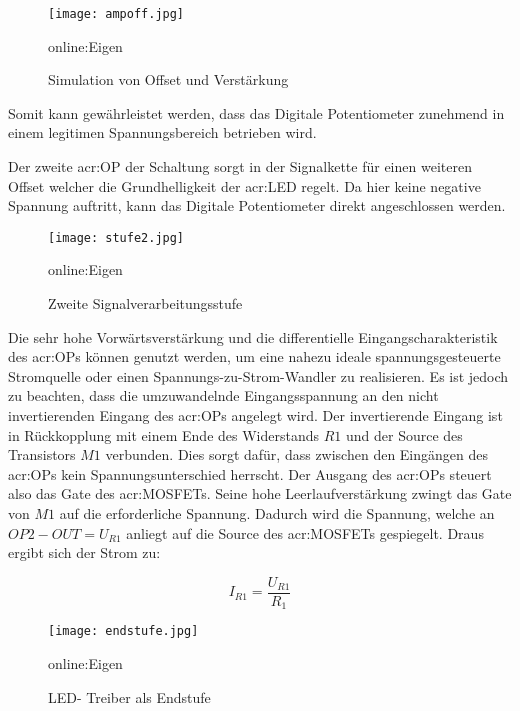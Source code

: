 \begin{figure}[H]
	\centering
	\texttt{[image: ampoff.jpg]}
	\caption[Simulation von Offset und Verstärkung]{Simulation von Offset und Verstärkung} \gls{online:Eigen}
	\label{fig:ampoff}
\end{figure}

Somit kann gewährleistet werden, dass das Digitale Potentiometer zunehmend in einem legitimen Spannungsbereich betrieben wird.

Der zweite \gls{acr:OP} der Schaltung sorgt in der Signalkette für einen weiteren
Offset welcher die Grundhelligkeit der \gls{acr:LED} regelt. Da hier keine negative Spannung auftritt, kann das Digitale Potentiometer direkt angeschlossen werden.

\begin{figure}[H]
	\centering
	\texttt{[image: stufe2.jpg]}
	\caption[Zweite Signalverarbeitungsstufe]{Zweite Signalverarbeitungsstufe} \gls{online:Eigen}
	\label{fig:stufe2}
\end{figure}


Die sehr hohe Vorwärtsverstärkung und die differentielle Eingangscharakteristik des \gls{acr:OP}s können genutzt werden, um eine nahezu ideale spannungsgesteuerte Stromquelle oder einen Spannungs-zu-Strom-Wandler zu realisieren. Es ist jedoch zu beachten, dass die umzuwandelnde Eingangsspannung an den nicht invertierenden Eingang des \gls{acr:OP}s angelegt wird. Der invertierende Eingang ist in Rückkopplung mit einem Ende des Widerstands $R{1}$ und der Source des Transistors $M{1}$ verbunden. Dies sorgt dafür, dass zwischen den Eingängen des \gls{acr:OP}s kein Spannungsunterschied herrscht. Der Ausgang des \gls{acr:OP}s steuert also das Gate des \gls{acr:MOSFET}s. Seine hohe Leerlaufverstärkung zwingt das Gate von $M{1}$ auf die erforderliche Spannung. Dadurch wird die Spannung, welche an $OP2-OUT = U_{R1}$ anliegt auf die Source des \gls{acr:MOSFET}s gespiegelt. Draus ergibt sich der Strom zu: 

\begin{equation}
	\label{equ:bsp1}
	I_{R1} = \frac{U_{R1}}{R_{1}}
\end{equation}

\begin{figure}[H]
	\centering
	\texttt{[image: endstufe.jpg]}
	\caption[LED- Treiber als Endstufe]{LED- Treiber als Endstufe} \gls{online:Eigen}
	\label{fig:endstufe}
\end{figure}

